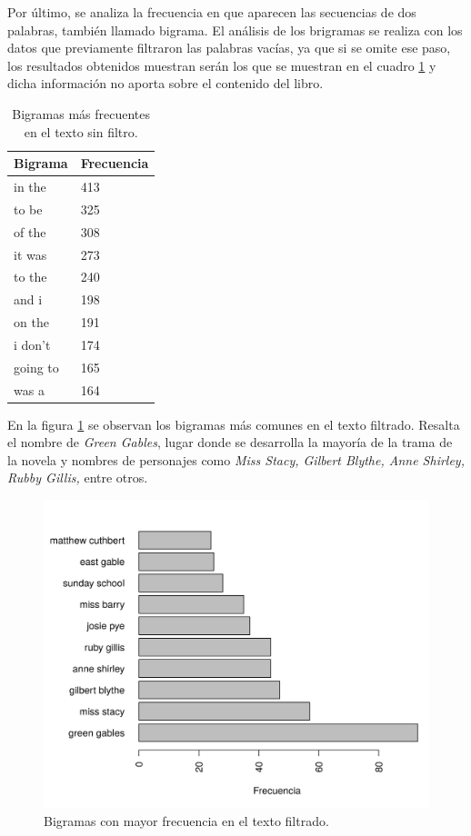 \documentclass[12pt]{article}
\begin{document}
	Por último, se analiza la frecuencia en que aparecen las secuencias de dos palabras, también llamado bigrama. El análisis de los brigramas se realiza con los datos que previamente filtraron las palabras vacías, ya que si se omite ese paso, los resultados obtenidos muestran serán los que se muestran en el cuadro \ref{frecuencia_bigramas} y dicha información no aporta sobre el contenido del libro.
	
	\begin{table}
		\centering
		\caption{Bigramas más frecuentes en el texto sin filtro.}
		\label{frecuencia_bigramas}
		\begin{tabular}{l|l}
			\hline
			Bigrama & Frecuencia \\
			\hline
		  	in the  &   413 \\
			to be    &  325 \\
		 	of the   &  308 \\
		 	it was   &  273 \\
		 	to the   &  240 \\
		 	and i    &  198 \\
		 	on the   &  191 \\
		 	i don't  &  174 \\
		 	going to &  165 \\
		 	was a    &  164 \\
			\hline
		\end{tabular}
	\end{table}

	En la figura \ref{bigrama_barplot} se observan los bigramas más comunes en el texto filtrado. Resalta el nombre de \textit{Green Gables}, lugar donde se desarrolla la mayoría de la trama de la novela y nombres de personajes como \textit{Miss Stacy,  Gilbert Blythe, Anne Shirley, Rubby Gillis,} entre otros.
	
	\begin{figure}
		\centering
		\includegraphics[scale=0.7]{bigrama.png}
		\caption{Bigramas con mayor frecuencia en el texto filtrado.}
		\label{bigrama_barplot}
	\end{figure}
	


\end{document}
